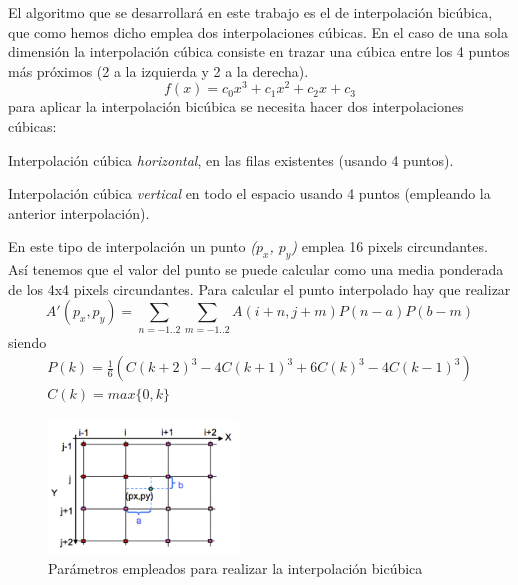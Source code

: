 \documentclass{article}
\begin{document}
{\setlength{\parskip}{0mm}
El algoritmo que se desarrollará en este trabajo es el de interpolación bicúbica, que como hemos dicho emplea dos interpolaciones cúbicas. En el caso de una sola dimensión la interpolación cúbica consiste en trazar una cúbica entre los 4 puntos más próximos (2 a la izquierda y 2 a la derecha).
\begin{equation}
\label{eq:interpolacionCubica}
f(x) = c_0 x^3 + c_1 x^2 + c_2 x + c_3
\end{equation}
para aplicar la interpolación bicúbica se necesita hacer dos interpolaciones cúbicas:
\begin{enumerate}{\setlength{\parskip}{0mm}
	\item Interpolación cúbica \emph{horizontal}, en las filas existentes (usando 4 puntos).
	\item Interpolación cúbica \emph{vertical} en todo el espacio usando 4 puntos (empleando la anterior interpolación).
}\end{enumerate}
}

En este tipo de interpolación un punto \emph{($p_x$, $p_y$)} emplea 16 pixels circundantes. Así tenemos que el valor del punto se puede calcular como una media ponderada de los 4x4 pixels circundantes. Para calcular el punto interpolado hay que realizar
\begin{equation}
	A'(p_x ,p_y ) = \sum_{n = -1..2} \sum_{m=-1..2} A(i+n, j+m)P(n-a)P(b-m)
\end{equation}
siendo
\begin{displaymath}
	\begin{matrix}	
		P(k) = \frac{1}{6}(C(k+2)^3 - 4C(k+1)^3 + 6C(k)^3 -4C(k-1)^3) \\
		C(k) = max\lbrace 0, k \rbrace
	\end{matrix}
\end{displaymath}

\begin{figure}[h]
  \centering
    \includegraphics[width=0.45\textwidth]{img/interpolation.png}
  \caption{Parámetros empleados para realizar la interpolación bicúbica}
  \label{fig:interpolation}
\end{figure}
\end{document}

